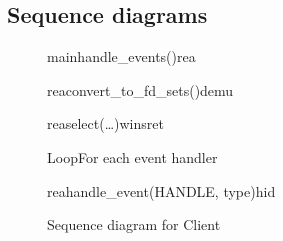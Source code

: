 \documentclass[Main]{subfiles}
\begin{document}
\subsection{Sequence diagrams}

\begin{figure}
\begin {sequencediagram}

	\begin{messcall}{main}{handle\_events()}{rea}
			\begin{messcall}{rea}{convert\_to\_fd\_sets()}{demu}
			\end{messcall}

			\begin{call}{rea}{select(\dots)}{wins}{ret}
			\end{call}

			\begin{sdblock}{Loop}{For each event handler}
				\begin{messcall}{rea}{handle\_event(HANDLE, type)}{hid}
				\end{messcall}
			\end{sdblock}

		\end{messcall}

\end{sequencediagram}

\caption{Sequence diagram for Client}
\label{seq:clientMainSeq}
\end{figure}
\end{document}
